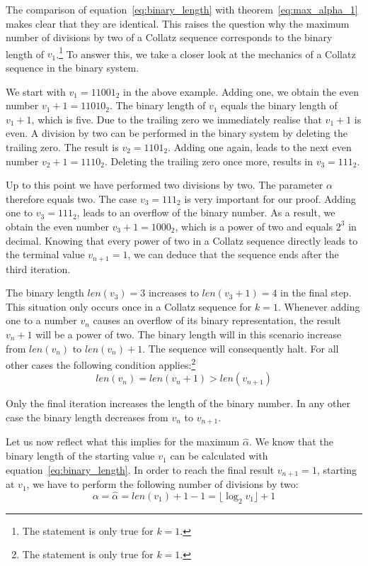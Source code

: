 \documentclass{SciPress_2015}
\begin{document}
The comparison of equation~\ref{eq:binary_length} with theorem~\ref{eq:max_alpha_1} makes clear that they are identical. This raises the question why the maximum number of divisions by two of a Collatz sequence corresponds to the binary length of $v_1$.\footnote{The statement is only true for $k=1$.} To answer this, we take a closer look at the mechanics of a Collatz sequence in the binary system.

\par\medskip
We start with $v_1=11001_2$ in the above example. Adding one, we obtain the even number $v_1+1=11010_2$. The binary length of $v_1$ equals the binary length of $v_1+1$, which is five. Due to the trailing zero we immediately realise that $v_1+1$ is even. A division by two can be performed in the binary system by deleting the trailing zero. The result is $v_2=1101_2$. Adding one again, leads to the next even number $v_2+1=1110_2$. Deleting the trailing zero once more, results in $v_3=111_2$.

\par\medskip
Up to this point we have performed two divisions by two. The parameter $\alpha$ therefore equals two. The case $v_3=111_2$ is very important for our proof. Adding one to $v_3=111_2$, leads to an overflow of the binary number. As a result, we obtain the even number $v_3+1=1000_2$, which is a power of two and equals $2^3$ in decimal. Knowing that every power of two in a Collatz sequence directly leads to the terminal value $v_{n+1}=1$, we can deduce that the sequence ends after the third iteration.

\par\medskip
The binary length $len(v_3)=3$ increases to $len(v_3+1)=4$ in the final step. This situation only occurs once in a Collatz sequence for $k=1$. Whenever adding one to a number $v_n$ causes an overflow of its binary representation, the result $v_n+1$ will be a power of two. The binary length will in this scenario increase from $len(v_n)$ to $len(v_n)+1$. The sequence will consequently halt. For all other cases the following condition applies:\footnote{The statement is only true for $k=1$.}
\[
	len(v_n)=len(v_n+1)>len(v_{n+1})
\]

Only the final iteration increases the length of the binary number. In any other case the binary length decreases from $v_n$ to $v_{n+1}$.

\par\medskip
Let us now reflect what this implies for the maximum $\hat\alpha$. We know that the binary length of the starting value $v_1$ can be calculated with equation~\ref{eq:binary_length}. In order to reach the final result $v_{n+1}=1$, starting at $v_1$, we have to perform the following number of divisions by two:
\begin{equation}
	\alpha=\hat\alpha=len(v_1)+1-1=\lfloor\log_2 v_1\rfloor+1
\end{equation}
\end{document}
